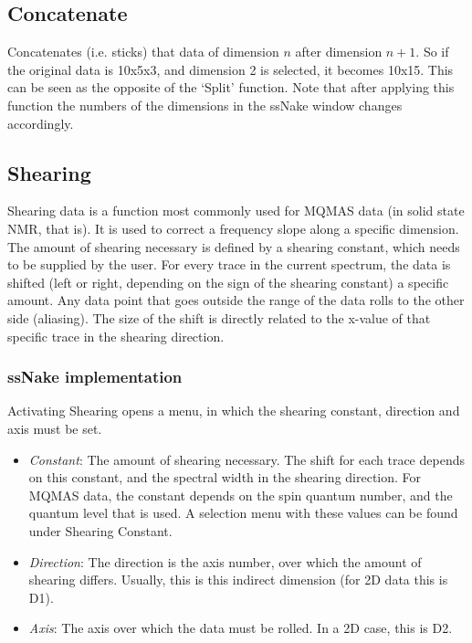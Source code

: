 \documentclass[11pt,a4paper]{article}
\begin{document}
\subsection{Concatenate}
Concatenates (i.e. sticks) that data of dimension $n$ after dimension $n+1$. So if the original data is 10x5x3, and dimension 2 is selected,
it becomes 10x15. This can be seen as the opposite of the `Split' function. Note that after applying this function the numbers of the dimensions in the ssNake window changes accordingly.

\subsection{Shearing}
Shearing data is a function most commonly used for MQMAS data (in solid state NMR, that is). It is used to correct a frequency slope along a specific dimension.
The amount of shearing necessary is defined by a shearing constant, which needs to be supplied by the user. 
For every trace in the current spectrum, the data is shifted (left or right, depending on the sign of the shearing constant) a specific amount. Any data point that goes outside 
the range of the data rolls to the other side (aliasing). The size of the shift is directly related to the x-value of that specific trace in the shearing direction.


\subsubsection*{ssNake implementation}
Activating Shearing opens a menu, in which the shearing constant, direction and axis must be set.

\begin{itemize}
  \item \textit{Constant}: The amount of shearing necessary. The shift for each trace depends on this constant, and the spectral width in the shearing direction.
	 For MQMAS data, the constant depends on the spin quantum number, and the quantum level that is used. A selection menu with these values can be found under Shearing Constant.
  \item \textit{Direction}: The direction is the axis number, over which the amount of shearing differs. Usually, this is this indirect dimension (for 2D data this is D1).
  \item \textit{Axis}: The axis over which the data must be rolled. In a 2D case, this is D2.
\end{itemize}
\end{document}
